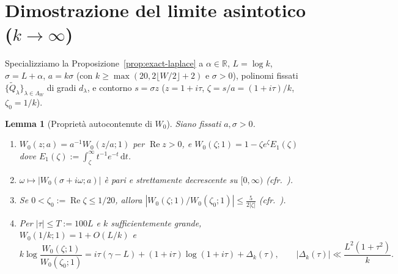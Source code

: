 \documentclass[11pt, reqno]{amsart}
\newtheorem{lemma}{Lemma}[section]
\theoremstyle{remark}
\numberwithin{equation}{section}
\DeclareMathOperator{\re}{Re}
\newcommand{\R}{\mathbb{R}}
\newcommand{\dd}{\,\mathrm{d}}
\begin{document}
\section{Dimostrazione del limite asintotico (\texorpdfstring{$k \to \infty$}{k -> infinito})}\label{sec:asymptotic}

Specializziamo la Proposizione~\ref{prop:exact-laplace} a $\alpha \in \R$, $L = \log k$, $\sigma = L+\alpha$,
$a = k\sigma$ (con $k \ge \max(20, 2\lfloor W/2\rfloor + 2)$ e $\sigma > 0$), polinomi fissati
$\{\widetilde{Q}_\lambda\}_{\lambda\in\Lambda_W}$ di gradi $d_\lambda$, e contorno $s = \sigma z$
($z = 1+i\tau$, $\zeta = s/a = (1+i\tau)/k$, $\zeta_0 = 1/k$).

\begin{lemma}[Proprietà autocontenute di $W_0$]\label{lem:W0-props}
Siano fissati $a, \sigma > 0$.
\begin{enumerate}
\item[(i)] $W_0(z; a) = a^{-1} W_0(z/a; 1)$ per $\re z > 0$, e $W_0(\zeta; 1) = 1 - \zeta e^\zeta E_1(\zeta)$
dove $E_1(\zeta) := \int_\zeta^\infty t^{-1} e^{-t}\dd t$.
\item[(ii)] $\omega \mapsto |W_0(\sigma + i\omega; a)|$ è pari e strettamente decrescente su $[0,\infty)$ (cfr.\ \cite[Lemma~5]{Lewulis}).
\item[(iii)] Se $0 < \zeta_0 := \re\zeta \le 1/20$, allora $|W_0(\zeta;1)/W_0(\zeta_0;1)| \le \frac{5}{2|\zeta|}$ (cfr.\ \cite[Lemma~6]{Lewulis}).
\item[(iv)] Per $|\tau| \le T := 100 L$ e $k$ sufficientemente grande, $W_0(1/k;1) = 1 + O(L/k)$ e
\begin{equation}\label{eq:W0-log-exp}
k \log\frac{W_0(\zeta;1)}{W_0(\zeta_0;1)} = i\tau(\gamma - L) + (1+i\tau)\log(1+i\tau) + \Delta_k(\tau),
\qquad |\Delta_k(\tau)| \ll \frac{L^2(1+\tau^2)}{k}.
\end{equation}
\end{enumerate}
\end{lemma}
\end{document}
